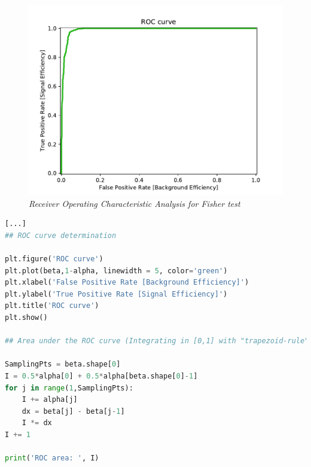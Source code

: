 \begin{figure}
	\centering
	\includegraphics[width=.7\textwidth]{Immagini/Es7Fig4.pdf}
	\caption{\emph{Receiver Operating Characteristic Analysis for Fisher test} }
	\label{Es7ROCfig}
\end{figure}

\begin{lstlisting}[language=python, style=Pystyle, caption=\texttt{Python} code for ROC curve analysis for Fisher test , label=Es7ROClist]
[...]
## ROC curve determination

plt.figure('ROC curve')
plt.plot(beta,1-alpha, linewidth = 5, color='green')
plt.xlabel('False Positive Rate [Background Efficiency]')
plt.ylabel('True Positive Rate [Signal Efficiency]')
plt.title('ROC curve')
plt.show()

## Area under the ROC curve (Integrating in [0,1] with "trapezoid-rule")

SamplingPts = beta.shape[0]
I = 0.5*alpha[0] + 0.5*alpha[beta.shape[0]-1]
for j in range(1,SamplingPts):
	I += alpha[j]
	dx = beta[j] - beta[j-1]
	I *= dx
I += 1

print('ROC area: ', I)
\end{lstlisting}